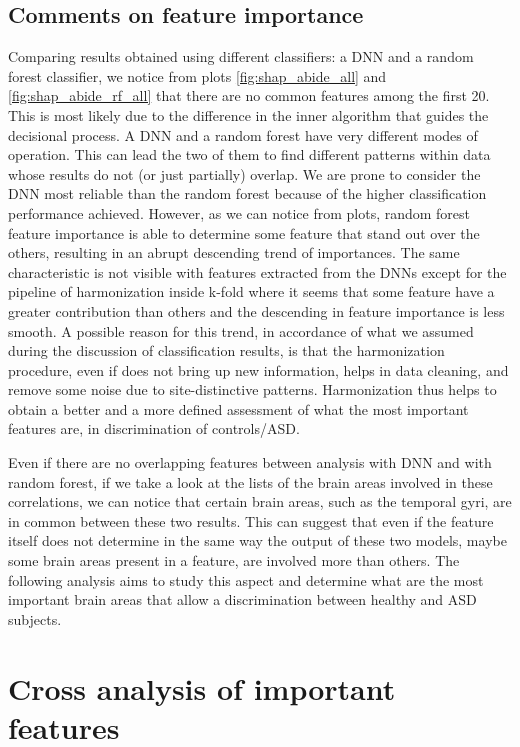 \documentclass[11pt]{report}
\begin{document}
\subsection{Comments on feature importance}
Comparing results obtained using different classifiers: a DNN and a random forest classifier, we notice from plots \ref{fig:shap_abide_all} and \ref{fig:shap_abide_rf_all} that there are no common features among the first 20. 
This is most likely due to the difference in the inner algorithm that guides the decisional process. 
A DNN and a random forest have very different modes of operation. 
This can lead the two of them to find different patterns within data whose results do not (or just partially) overlap.
We are prone to consider the DNN most reliable than the random forest because of the higher classification performance achieved.
However, as we can notice from plots, random forest feature importance is able to determine some feature that stand out over the others, resulting in an abrupt descending trend of importances.
The same characteristic is not visible with features extracted from the DNNs except for the pipeline of harmonization inside k-fold where it seems that some feature have a greater contribution than others and the descending in feature importance is less smooth.
A possible reason for this trend, in accordance of what we assumed during the discussion of classification results, is that the harmonization procedure, even if does not bring up new information, helps in data cleaning, and remove some noise due to site-distinctive patterns.
Harmonization thus helps to obtain a better and a more defined assessment of what the most important features are, in discrimination of controls/ASD.

Even if there are no overlapping features between analysis with DNN and with random forest, if we take a look at the lists of the brain areas involved in these correlations, we can notice that certain brain areas, such as the temporal gyri, are in common between these two results.
This can suggest that even if the feature itself does not determine in the same way the output of these two models, maybe some brain areas present in a feature, are involved more than others.
The following analysis aims to study this aspect and determine what are the most important brain areas that allow a discrimination between healthy and ASD subjects.

\newpage
\section{Cross analysis of important features}\label{sec:feature_importance_5}
\end{document}
